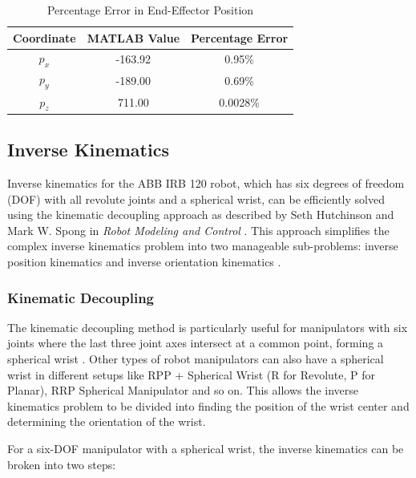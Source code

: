\begin{table}[H]
  \centering\label{tab:percentage_error}
  \begin{tabular}{|c|c|c|}
    \hline
    \rowcolor{black} \color{white}Coordinate & \color{white}MATLAB Value & \color{white}Percentage Error \\
    \hline
    \( p_x \)                                & -163.92                   & 0.95\%                        \\
    \hline
    \( p_y \)                                & -189.00                   & 0.69\%                        \\
    \hline
    \( p_z \)                                & 711.00                    & 0.0028\%                      \\
    \hline
  \end{tabular}
  \caption{Percentage Error in End-Effector Position}
\end{table}


\newpage
\subsection{Inverse Kinematics}
Inverse kinematics for the ABB IRB 120 robot, which has six degrees of freedom (DOF) with all revolute joints and a spherical wrist, can be efficiently solved using the kinematic decoupling approach as described by Seth Hutchinson and Mark W. Spong in \textit{Robot Modeling and Control} \cite{Modeling}. This approach simplifies the complex inverse kinematics problem into two manageable sub-problems: inverse position kinematics and inverse orientation kinematics \cite{Modeling}.

\subsubsection{Kinematic Decoupling}
The kinematic decoupling method is particularly useful for manipulators with six joints where the last three joint axes intersect at a common point, forming a spherical wrist \cite{Modeling}. Other types of robot manipulators can also have a spherical wrist in different setups like RPP + Spherical Wrist (R for Revolute, P for Planar), RRP Spherical Manipulator and so on. This allows the inverse kinematics problem to be divided into finding the position of the wrist center and determining the orientation of the wrist.

\noindent For a six-DOF manipulator with a spherical wrist, the inverse kinematics can be broken into two steps:

